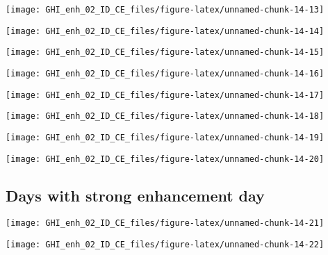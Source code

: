 \documentclass[
  10pt,
  a4paper,oneside]{article}
\begin{document}
\begin{center}\texttt{[image: GHI\_enh\_02\_ID\_CE\_files/figure-latex/unnamed-chunk-14-13]} \end{center}

\begin{center}\texttt{[image: GHI\_enh\_02\_ID\_CE\_files/figure-latex/unnamed-chunk-14-14]} \end{center}

\begin{center}\texttt{[image: GHI\_enh\_02\_ID\_CE\_files/figure-latex/unnamed-chunk-14-15]} \end{center}

\begin{center}\texttt{[image: GHI\_enh\_02\_ID\_CE\_files/figure-latex/unnamed-chunk-14-16]} \end{center}

\begin{center}\texttt{[image: GHI\_enh\_02\_ID\_CE\_files/figure-latex/unnamed-chunk-14-17]} \end{center}

\begin{center}\texttt{[image: GHI\_enh\_02\_ID\_CE\_files/figure-latex/unnamed-chunk-14-18]} \end{center}

\begin{center}\texttt{[image: GHI\_enh\_02\_ID\_CE\_files/figure-latex/unnamed-chunk-14-19]} \end{center}

\begin{center}\texttt{[image: GHI\_enh\_02\_ID\_CE\_files/figure-latex/unnamed-chunk-14-20]} \end{center}

\FloatBarrier

\hypertarget{days-with-strong-enhancement-day}{%
\subsection{Days with strong enhancement day}\label{days-with-strong-enhancement-day}}

\begin{center}\texttt{[image: GHI\_enh\_02\_ID\_CE\_files/figure-latex/unnamed-chunk-14-21]} \end{center}

\begin{center}\texttt{[image: GHI\_enh\_02\_ID\_CE\_files/figure-latex/unnamed-chunk-14-22]} \end{center}
\end{document}
